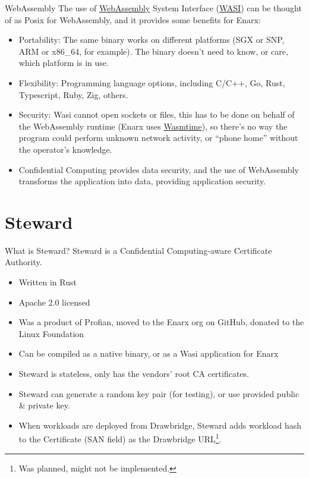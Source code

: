 \documentclass[graphics,compress]{beamer}
\begin{document}
\begin{frame}{WebAssembly}
    The use of \href{https://webassembly.org}{WebAssembly} System Interface (\href{https://wasi.dev}{WASI}) can be thought of as Posix for WebAssembly, and it provides some benefits for Enarx:
    \begin{itemize}
        \item Portability: The same binary works on different platforms (SGX or SNP, ARM or x86\_64, for example). The binary doesn't need to know, or care, which platform is in use.
        \item Flexibility: Programming language options, including C/C++, Go, Rust, Typescript, Ruby, Zig, others.
        \item Security: Wasi cannot open sockets or files, this has to be done on behalf of the WebAssembly runtime (Enarx uses \href{https://wasmtime.dev}{Wasmtime}), so there's no way the program could perform unknown network activity, or ``phone home'' without the operator's knowledge.
        \item Confidential Computing provides data security, and the use of WebAssembly transforms the application into data, providing application security.
    \end{itemize}
\end{frame}

\section{Steward}
\begin{frame}{What is Steward?}
Steward is a Confidential Computing-aware Certificate Authority.
\begin{itemize}
    \item Written in Rust
    \item Apache 2.0 licensed
    \item Was a product of Profian, moved to the Enarx org on GitHub, donated to the Linux Foundation
    \item Can be compiled as a native binary, or as a Wasi application for Enarx
    \item Steward is stateless, only has the vendors' root CA certificates.
    \item Steward can generate a random key pair (for testing), or use provided public \& private key.
    \item When workloads are deployed from Drawbridge, Steward adds workload hash to the Certificate (SAN field) as the Drawbridge URL\footnote{Was planned, might not be implemented.}.
\end{itemize}
\end{frame}
\end{document}
